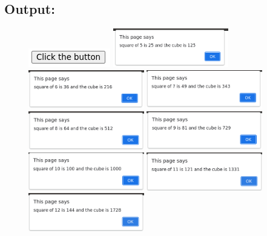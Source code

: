 \documentclass[12pt, a4paper]{article}
\begin{document}
\subsection*{Output:}
\begin{figure}[h]
  \centering
  \includegraphics{16}
  \vskip30pt
  \includegraphics[width=0.45\textwidth]{17}
  \includegraphics[width=0.45\textwidth]{18}
  \includegraphics[width=0.45\textwidth]{19}
  \includegraphics[width=0.45\textwidth]{20}
  \includegraphics[width=0.45\textwidth]{21}
  \includegraphics[width=0.45\textwidth]{22}
  \includegraphics[width=0.45\textwidth]{23}
  \includegraphics[width=0.45\textwidth]{24}

\end{figure}
\end{document}
